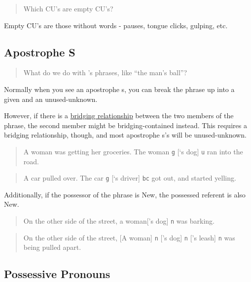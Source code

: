 \documentclass[
]{book}
\begin{document}
\begin{quote}
Which CU's are empty CU's?
\end{quote}

Empty CU's are those without words - pauses, tongue clicks, gulping, etc.

\hypertarget{apostrophe-s}{%
\subsection{Apostrophe S}\label{apostrophe-s}}

\begin{quote}
What do we do with 's phrases, like ``the man's ball''?
\end{quote}

Normally when you see an apostrophe s, you can break the phrase up into a given and an unused-unknown.

However, if there is a \protect\hyperlink{bridging-relationships}{bridging relationship} between the two members of the phrase, the second member might be bridging-contained instead.
This requires a bridging relationship, though, and most apostrophe s's will be unused-unknown.

\begin{quote}
A woman was getting her groceries.
The woman \texttt{g} {[}`s dog{]} \texttt{u} ran into the road.
\end{quote}

\begin{quote}
A car pulled over.
The car \texttt{g} {[}`s driver{]} \texttt{bc} got out, and started yelling.
\end{quote}

Additionally, if the possessor of the phrase is New,
the possessed referent is also New.

\begin{quote}
On the other side of the street, a woman{[}'s dog{]} \texttt{n} was barking.
\end{quote}

\begin{quote}
On the other side of the street,
{[}A woman{]} \texttt{n} {[}'s dog{]} \texttt{n} {[}'s leash{]} \texttt{n} was being pulled apart.
\end{quote}

\hypertarget{possessive-pronouns}{%
\subsection{Possessive Pronouns}\label{possessive-pronouns}}
\end{document}

